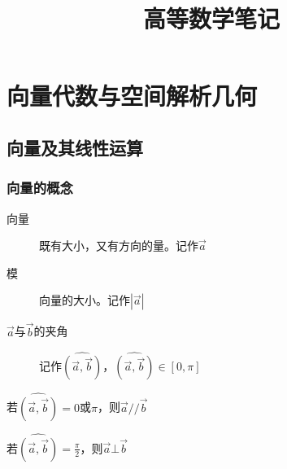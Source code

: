 \documentclass{article} %
\title{高等数学笔记}  %
\author{}   %
\date{}       %
\begin{document}
\maketitle          %

\tableofcontents
\thispagestyle{empty}
\clearpage
\setcounter{page}{1}



\section{向量代数与空间解析几何}
\subsection{向量及其线性运算}
\subsubsection{向量的概念}
\begin{description}
    \item[向量]{既有大小，又有方向的量。记作$\overrightarrow{a}$} 
    \item[模]{向量的大小。记作$|\overrightarrow{a}|$} 
    \item[$\overrightarrow{a}$与$\overrightarrow{b}$的夹角]{记作$\widehat{(\overrightarrow{a},\overrightarrow{b})}$，$\widehat{(\overrightarrow{a},\overrightarrow{b})}\in[0,\pi]$} 
\end{description}

若$\widehat{(\overrightarrow{a},\overrightarrow{b})}=0$或$\pi$，则$\overrightarrow{a}//\overrightarrow{b}$\par
若$\widehat{(\overrightarrow{a},\overrightarrow{b})}=\frac{\pi}{2}$，则$\overrightarrow{a}\bot \overrightarrow{b}$\par
\end{document}
